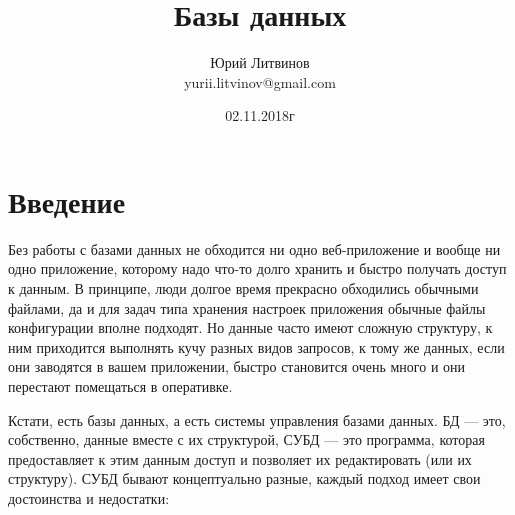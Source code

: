 \documentclass[a5paper]{article}
\title{Базы данных}
\author{Юрий Литвинов\\\small{yurii.litvinov@gmail.com}}
\date{02.11.2018г}
\begin{document}
\maketitle
\thispagestyle{empty}

\section{Введение}

Без работы с базами данных не обходится ни одно веб-приложение и вообще ни одно приложение, которому надо что-то долго хранить и быстро получать доступ к данным. В принципе, люди долгое время прекрасно обходились обычными файлами, да и для задач типа хранения настроек приложения обычные файлы конфигурации вполне подходят. Но данные часто имеют сложную структуру, к ним приходится выполнять кучу разных видов запросов, к тому же данных, если они заводятся в вашем приложении, быстро становится очень много и они перестают помещаться в оперативке.

Кстати, есть базы данных, а есть системы управления базами данных. БД --- это, собственно, данные вместе с их структурой, СУБД --- это программа, которая предоставляет к этим данным доступ и позволяет их редактировать (или их структуру). СУБД бывают концептуально разные, каждый подход имеет свои достоинства и недостатки:
\end{document}
